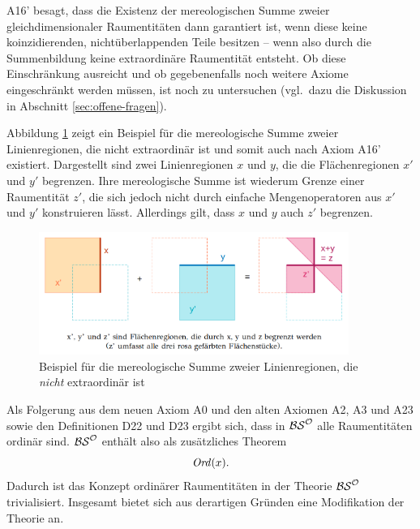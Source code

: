 A16' besagt, dass die Existenz der mereologischen Summe zweier gleichdimensionaler Raumentitäten dann garantiert ist, wenn diese keine koinzidierenden, nichtüberlappenden Teile besitzen -- wenn also durch die Summenbildung keine extraordinäre Raumentität entsteht.
Ob diese Einschränkung ausreicht und ob gegebenenfalls noch weitere Axiome eingeschränkt werden müssen, ist noch zu untersuchen (vgl.\ dazu die Diskussion in Abschnitt \ref{sec:offene-fragen}).

Abbildung \ref{fig:summe-linien} zeigt ein Beispiel für die mereologische Summe zweier Linienregionen, die nicht extraordinär ist und somit auch nach Axiom A16' existiert.
Dargestellt sind zwei Linienregionen $x$ und $y$, die die Flächenregionen $x'$ und $y'$ begrenzen.
Ihre mereologische Summe ist wiederum Grenze einer Raumentität $z'$, die sich jedoch nicht durch einfache Mengenoperatoren aus $x'$ und $y'$ konstruieren lässt.
Allerdings gilt, dass $x$ und $y$ auch $z'$ begrenzen.

\begin{figure}[ht]
    \centering
    \includegraphics[width=0.9\textwidth]{abb/summe-linien.png}
    \caption{Beispiel für die mereologische Summe zweier Linienregionen, die \textit{nicht} extraordinär ist}
    \label{fig:summe-linien}
\end{figure}

Als Folgerung aus dem neuen Axiom A0 und den alten Axiomen A2, A3 und A23 sowie den Definitionen D22 und D23 ergibt sich, dass in $\mathcal{BS}^{\mathcal{O}}$ alle Raumentitäten ordinär sind. $\mathcal{BS}^{\mathcal{O}}$ enthält also als zusätzliches Theorem
$$ \mathit{Ord}(x). $$
Dadurch ist das Konzept ordinärer Raumentitäten in der Theorie $\mathcal{BS}^{\mathcal{O}}$ trivialisiert. Insgesamt bietet sich aus derartigen Gründen eine Modifikation der Theorie an.

